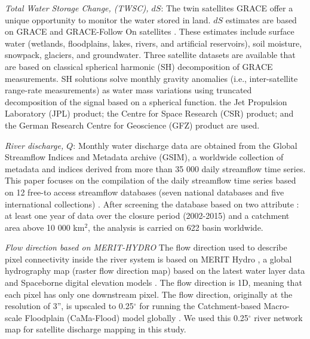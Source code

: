 \documentclass[draft]{agujournal2019}
\begin{document}
{\it Total Water Storage Change, (TWSC), $dS$}: The twin satellites GRACE \cite{tapley} offer a unique opportunity to monitor the water stored in land. $dS$ estimates are based on GRACE and GRACE-Follow On satellites \cite{tapley}. These estimates include surface water (wetlands, floodplains, lakes, rivers, and artificial reservoirs), soil moisture, snowpack, glaciers, and groundwater. Three satellite datasets are available that are based on classical spherical harmonic (SH) decomposition of GRACE measurements. SH solutions solve monthly gravity anomalies (i.e., inter-satellite range-rate measurements) as water mass variations using truncated decomposition of the signal based on a spherical function. the Jet Propulsion Laboratory (JPL) \cite{Watkins} product; the Centre for Space Research (CSR) \cite{Bettadpur2012} product; and the German Research Centre for Geoscience (GFZ) \cite{Dahle2013} product are used.

{\it River discharge, $Q$}: Monthly water discharge data are obtained from the Global Streamflow Indices and Metadata archive (GSIM), a worldwide collection of metadata and indices derived from more than 35 000 daily streamflow time series. This paper focuses on the compilation of the daily streamflow time series based on 12 free-to access streamflow databases (seven national databases and five international collections) \cite{Do2018a}. After screening the database based on two attribute : at least one year of data over the closure period (2002-2015) and a catchment area above 10 000 km$^2$, the analysis is carried on 622 basin worldwide.

{\it Flow direction based on MERIT-HYDRO}
The flow direction used to describe pixel connectivity inside the river system is based on MERIT Hydro \cite{Yamazaki2019a}, a global hydrography map (raster flow direction map) based on the latest water layer data and Spaceborne digital elevation models \cite{Yamazaki2017}. The flow direction is 1D, meaning that each pixel has only one downstream pixel. The flow direction, originally at the resolution of 3'', is upscaled to 0.25$^\circ$ for running the Catchment-based Macro-scale Floodplain (CaMa-Flood) model globally \cite{Yamazaki2011}. We used this 0.25$^\circ$  river network map for satellite discharge mapping in this study.
\end{document}
